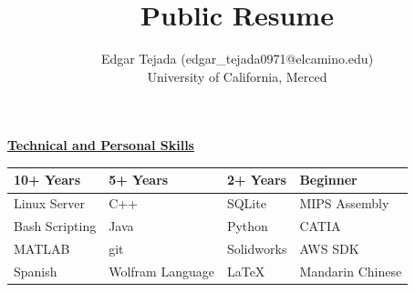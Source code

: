 \documentclass [11pt]{article}
\title{Public Resume}
\author{Edgar Tejada (edgar_tejada0971@elcamino.edu)\\University of California, Merced}
\begin{document}
\begin{flushleft}


\raggedright \underline{\textbf{Technical and Personal Skills}}
\linebreak
{
\centering
\begin{tabularx}{0.8\textwidth} { 
  | >{\centering\arraybackslash}X | 
  | >{\centering\arraybackslash}X | 
  | >{\centering\arraybackslash}X | 
  | >{\centering\arraybackslash}X |}

	\hline
	\textbf{10+ Years} & \textbf{5+ Years} & \textbf{2+ Years} & \textbf{Beginner}\\ [0.5ex]
	\hline
	Linux Server & C++ & SQLite & MIPS Assembly\\ [0.5ex]
	\hline
	Bash Scripting & Java & Python & CATIA\\ [0.5ex]
	\hline
	MATLAB & git & Solidworks & AWS SDK\\ [0.5ex]
	\hline
	Spanish & Wolfram Language & \LaTeX & Mandarin Chinese\\ [0.5ex]
	\hline
\end{tabularx}

}
\raggedright


\end{flushleft}
\end{document}
